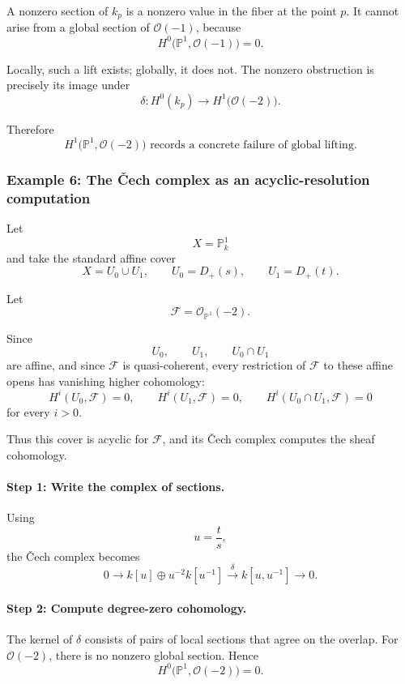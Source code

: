 \documentclass[12pt,a4paper]{article}
\theoremstyle{notespace}
\begin{document}
A nonzero section of \(k_{p}\) is a nonzero value in the fiber at the point
\(p\). It cannot arise from a global section of \(\mathcal{O}(-1)\), because
\[
H^{0}\bigl(\mathbb{P}^{1},\mathcal{O}(-1)\bigr)=0.
\]

Locally, such a lift exists; globally, it does not. The nonzero obstruction
is precisely its image under
\[
\delta:
H^{0}(k_{p})
\longrightarrow
H^{1}\bigl(\mathcal{O}(-2)\bigr).
\]

Therefore
\[
\boxed{
	H^{1}\bigl(\mathbb{P}^{1},\mathcal{O}(-2)\bigr)
	\text{ records a concrete failure of global lifting.}
}
\]

\subsubsection{Example 6: The Čech complex as an acyclic-resolution computation}

Let
\[
X=\mathbb{P}^{1}_{k}
\]
and take the standard affine cover
\[
X=U_{0}\cup U_{1},
\qquad
U_{0}=D_{+}(s),
\qquad
U_{1}=D_{+}(t).
\]

Let
\[
\mathcal{F}=\mathcal{O}_{\mathbb{P}^{1}}(-2).
\]

Since
\[
U_{0},
\qquad
U_{1},
\qquad
U_{0}\cap U_{1}
\]
are affine, and since \(\mathcal{F}\) is quasi-coherent, every restriction
of \(\mathcal{F}\) to these affine opens has vanishing higher cohomology:
\[
H^{i}(U_{0},\mathcal{F})=0,
\qquad
H^{i}(U_{1},\mathcal{F})=0,
\qquad
H^{i}(U_{0}\cap U_{1},\mathcal{F})=0
\]
for every \(i>0\).

Thus this cover is acyclic for \(\mathcal{F}\), and its Čech complex computes
the sheaf cohomology.

\paragraph{Step 1: Write the complex of sections.}

Using
\[
u=\frac{t}{s},
\]
the Čech complex becomes
\[
0
\longrightarrow
k[u]\oplus u^{-2}k[u^{-1}]
\xrightarrow{\delta}
k[u,u^{-1}]
\longrightarrow
0.
\]

\paragraph{Step 2: Compute degree-zero cohomology.}

The kernel of \(\delta\) consists of pairs of local sections that agree on
the overlap. For \(\mathcal{O}(-2)\), there is no nonzero global section.
Hence
\[
H^{0}\bigl(\mathbb{P}^{1},\mathcal{O}(-2)\bigr)=0.
\]
\end{document}
